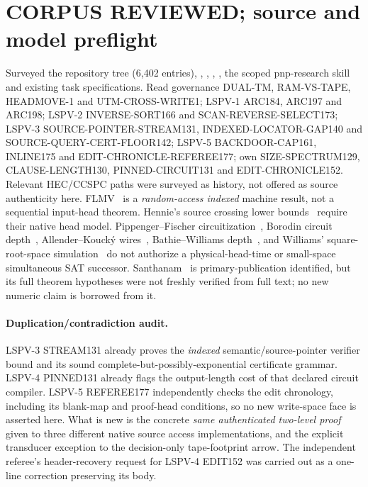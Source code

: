 \documentclass[11pt]{article}
\begin{document}
\section{CORPUS REVIEWED; source and model preflight}
Surveyed the repository tree (6,402 entries), , , , , the scoped pnp-research skill and existing task specifications. Read governance DUAL-TM, RAM-VS-TAPE, HEADMOVE-1 and UTM-CROSS-WRITE1; LSPV-1 ARC184, ARC197 and ARC198; LSPV-2 INVERSE-SORT166 and SCAN-REVERSE-SELECT173; LSPV-3 SOURCE-POINTER-STREAM131, INDEXED-LOCATOR-GAP140 and SOURCE-QUERY-CERT-FLOOR142; LSPV-5 BACKDOOR-CAP161, INLINE175 and EDIT-CHRONICLE-REFEREE177; own SIZE-SPECTRUM129, CLAUSE-LENGTH130, PINNED-CIRCUIT131 and EDIT-CHRONICLE152. Relevant HEC/CCSPC paths were surveyed as history, not offered as source authenticity here. FLMV~\cite{flmv} is a \emph{random-access indexed} machine result, not a sequential input-head theorem. Hennie's source crossing lower bounds~\cite{hennie} require their native head model. Pippenger--Fischer circuitization~\cite{pf}, Borodin circuit depth~\cite{borodin}, Allender--Kouck\'y wires~\cite{ak}, Bathie--Williams depth~\cite{bw}, and Williams' square-root-space simulation~\cite{williams} do not authorize a physical-head-time or small-space simultaneous SAT successor. Santhanam~\cite{santhanam} is primary-publication identified, but its full theorem hypotheses were not freshly verified from full text; no new numeric claim is borrowed from it.

\paragraph{Duplication/contradiction audit.} LSPV-3 STREAM131 already proves the \emph{indexed} semantic/source-pointer verifier bound and its sound complete-but-possibly-exponential certificate grammar. LSPV-4 PINNED131 already flags the output-length cost of that declared circuit compiler. LSPV-5 REFEREE177 independently checks the edit chronology, including its blank-map and proof-head conditions, so no new write-space face is asserted here. What is new is the concrete \emph{same authenticated two-level proof} given to three different native source access implementations, and the explicit transducer exception to the decision-only tape-footprint arrow. The independent referee's header-recovery request for LSPV-4 EDIT152 was carried out as a one-line correction preserving its body.
\end{document}
